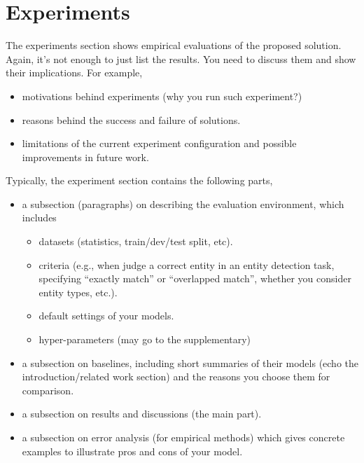 \section{Experiments}

The experiments section shows empirical evaluations of the proposed solution.
Again, it's not enough to just list the results.
You need to discuss them and show their implications.
For example, 
\begin{itemize}
    \item motivations behind experiments (why you run such experiment?)
    \item reasons behind the success and failure of solutions.
    \item limitations of the current experiment configuration and 
        possible improvements in future work.
\end{itemize}

Typically, the experiment section contains the following parts,
\begin{itemize}
    \item a subsection (paragraphs) on describing the evaluation environment,
        which includes 
    \begin{itemize}
        \item datasets (statistics, train/dev/test split, etc).
        \item criteria (e.g., when judge a correct entity in an entity detection task, 
            specifying ``exactly match'' or ``overlapped match'', 
            whether you consider entity types, etc.).
        \item default settings of your models.
        \item hyper-parameters (may go to the supplementary)
    \end{itemize}
    \item a subsection on baselines, including 
        short summaries of their models (echo the introduction/related work section)
        and the reasons you choose them for comparison.
    \item a subsection on results and discussions (the main part).
    \item a subsection on error analysis (for empirical methods) 
        which gives concrete examples to illustrate pros and cons of your model.
\end{itemize}




 

